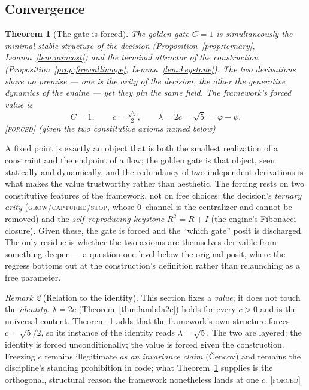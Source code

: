 \documentclass[11pt]{article}
\theoremstyle{plain}
\newtheorem{theorem}{Theorem}[section]
\theoremstyle{definition}
\theoremstyle{remark}
\newtheorem{remark}[theorem]{Remark}
\newcommand{\forced}{\textcolor{forcedc}{\textsc{[forced]}}}
\begin{document}
\subsection{Convergence}\label{ssec:converge}

\begin{theorem}[The gate is forced]\label{thm:gateforced}
The golden gate $C=1$ is simultaneously the minimal stable structure of the decision (Proposition~\ref{prop:ternary}, Lemma~\ref{lem:mincost}) and the terminal attractor of the construction (Proposition~\ref{prop:firewallimage}, Lemma~\ref{lem:keystone}). The two derivations share no premise --- one is the arity of the decision, the other the generative dynamics of the engine --- yet they pin the same field. The framework's forced value is
\begin{equation}\label{eq:goldenvalue}
\boxed{\;C=1,\qquad c=\tfrac{\sqrt5}{2},\qquad \lambda=2c=\sqrt5=\varphi-\psi.\;}
\end{equation}
\forced{} (given the two constitutive axioms named below)
\end{theorem}

A fixed point is exactly an object that is both the smallest realization of a constraint and the endpoint of a flow; the golden gate is that object, seen statically and dynamically, and the redundancy of two independent derivations is what makes the value trustworthy rather than aesthetic. The forcing rests on two constitutive features of the framework, not on free choices: the decision's \emph{ternary arity} (\textsc{grow}/\textsc{captured}/\textsc{stop}, whose $0$--channel is the centralizer and cannot be removed) and the \emph{self--reproducing keystone} $R^2=R+I$ (the engine's Fibonacci closure). Given these, the gate is forced and the ``which gate'' posit is discharged. The only residue is whether the two axioms are themselves derivable from something deeper --- a question one level below the original posit, where the regress bottoms out at the construction's definition rather than relaunching as a free parameter.

\begin{remark}[Relation to the identity]\label{rem:identityrelation}
This section fixes a \emph{value}; it does not touch the \emph{identity}. $\lambda=2c$ (Theorem~\ref{thm:lambda2c}) holds for every $c>0$ and is the universal content. Theorem~\ref{thm:gateforced} adds that the framework's own structure forces $c=\sqrt5/2$, so its instance of the identity reads $\lambda=\sqrt5$. The two are layered: the identity is forced unconditionally; the value is forced given the construction. Freezing $c$ remains illegitimate \emph{as an invariance claim} (\v{C}encov) and remains the discipline's standing prohibition in code; what Theorem~\ref{thm:gateforced} supplies is the orthogonal, structural reason the framework nonetheless lands at one $c$. \forced
\end{remark}
\end{document}
